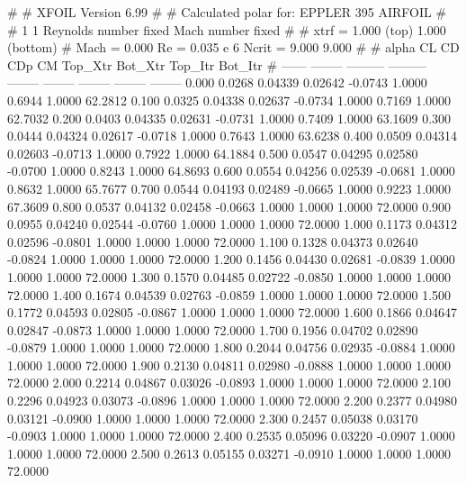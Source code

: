 #  
#       XFOIL         Version 6.99
#  
# Calculated polar for: EPPLER 395 AIRFOIL                              
#  
# 1 1 Reynolds number fixed          Mach number fixed         
#  
# xtrf =   1.000 (top)        1.000 (bottom)  
# Mach =   0.000     Re =     0.035 e 6     Ncrit =   9.000  9.000
#  
#   alpha    CL        CD       CDp       CM     Top_Xtr  Bot_Xtr  Top_Itr  Bot_Itr
#  ------ -------- --------- --------- -------- -------- -------- -------- --------
   0.000   0.0268   0.04339   0.02642  -0.0743   1.0000   0.6944   1.0000  62.2812
   0.100   0.0325   0.04338   0.02637  -0.0734   1.0000   0.7169   1.0000  62.7032
   0.200   0.0403   0.04335   0.02631  -0.0731   1.0000   0.7409   1.0000  63.1609
   0.300   0.0444   0.04324   0.02617  -0.0718   1.0000   0.7643   1.0000  63.6238
   0.400   0.0509   0.04314   0.02603  -0.0713   1.0000   0.7922   1.0000  64.1884
   0.500   0.0547   0.04295   0.02580  -0.0700   1.0000   0.8243   1.0000  64.8693
   0.600   0.0554   0.04256   0.02539  -0.0681   1.0000   0.8632   1.0000  65.7677
   0.700   0.0544   0.04193   0.02489  -0.0665   1.0000   0.9223   1.0000  67.3609
   0.800   0.0537   0.04132   0.02458  -0.0663   1.0000   1.0000   1.0000  72.0000
   0.900   0.0955   0.04240   0.02544  -0.0760   1.0000   1.0000   1.0000  72.0000
   1.000   0.1173   0.04312   0.02596  -0.0801   1.0000   1.0000   1.0000  72.0000
   1.100   0.1328   0.04373   0.02640  -0.0824   1.0000   1.0000   1.0000  72.0000
   1.200   0.1456   0.04430   0.02681  -0.0839   1.0000   1.0000   1.0000  72.0000
   1.300   0.1570   0.04485   0.02722  -0.0850   1.0000   1.0000   1.0000  72.0000
   1.400   0.1674   0.04539   0.02763  -0.0859   1.0000   1.0000   1.0000  72.0000
   1.500   0.1772   0.04593   0.02805  -0.0867   1.0000   1.0000   1.0000  72.0000
   1.600   0.1866   0.04647   0.02847  -0.0873   1.0000   1.0000   1.0000  72.0000
   1.700   0.1956   0.04702   0.02890  -0.0879   1.0000   1.0000   1.0000  72.0000
   1.800   0.2044   0.04756   0.02935  -0.0884   1.0000   1.0000   1.0000  72.0000
   1.900   0.2130   0.04811   0.02980  -0.0888   1.0000   1.0000   1.0000  72.0000
   2.000   0.2214   0.04867   0.03026  -0.0893   1.0000   1.0000   1.0000  72.0000
   2.100   0.2296   0.04923   0.03073  -0.0896   1.0000   1.0000   1.0000  72.0000
   2.200   0.2377   0.04980   0.03121  -0.0900   1.0000   1.0000   1.0000  72.0000
   2.300   0.2457   0.05038   0.03170  -0.0903   1.0000   1.0000   1.0000  72.0000
   2.400   0.2535   0.05096   0.03220  -0.0907   1.0000   1.0000   1.0000  72.0000
   2.500   0.2613   0.05155   0.03271  -0.0910   1.0000   1.0000   1.0000  72.0000
